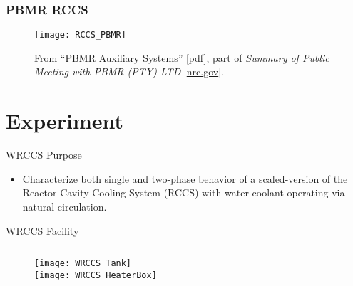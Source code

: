 \documentclass[10pt,t,xcolor=table]{UWMadBeamer}
\begin{document}
    \begin{frame}
        \frametitle{PBMR RCCS}
        \begin{figure}%
        \centering
        \caption{From ``PBMR Auxiliary Systems'' [\href{http://pbadupws.nrc.gov/docs/ML0606/ML060680134.pdf}{\scriptsize pdf}], part of \textit{Summary of Public Meeting with PBMR (PTY) LTD} [\href{http://pbadupws.nrc.gov/docs/ML0607/ML060750210.html}{\scriptsize  nrc.gov}].}
        \texttt{[image: RCCS\_PBMR]}
        \end{figure}
    \end{frame}


\section{Experiment}

\begin{frame}{WRCCS Purpose}
    \begin{itemize}
        \item Characterize both single and two-phase behavior of a scaled-version of the Reactor Cavity Cooling System (RCCS) with water coolant operating via natural circulation.
    \end{itemize}
\end{frame}

\begin{frame}{WRCCS Facility}
    \begin{columns}
        \hfill
        \begin{column}{0.28\paperwidth}
            \begin{figure}
                \centering
                \texttt{[image: WRCCS\_Tank]}\\
                \texttt{[image: WRCCS\_HeaterBox]}
            \end{figure}
        \end{column}
    \end{columns}
\end{frame}
\end{document}
